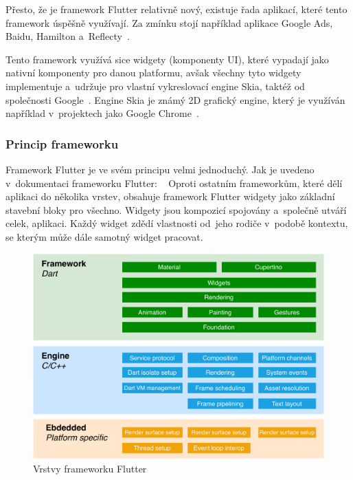 Přesto,
že je framework Flutter relativně nový,
existuje řada aplikací,
které tento framework úspěšně využívají.
Za zmínku stojí například aplikace Google Ads, Baidu, Hamilton
a~Reflecty~\cite{flutter}.

Tento framework využívá sice widgety (komponenty UI),
které vypadají jako nativní komponenty pro danou platformu,
avšak všechny tyto widgety implementuje a~udržuje pro vlastní vykreslovací
engine Skia,
taktéž od společnosti Google~\cite{flutter}.
Engine Skia je známý 2D grafický engine,
který je využíván například v~projektech jako Google Chrome~\cite{skia}.

\subsubsection*{Princip frameworku}

Framework Flutter je ve svém principu velmi jednoduchý.
Jak je uvedeno v~dokumentaci frameworku Flutter:
\emph{}~\cite{flutter_technical_overview}
Oproti ostatním frameworkům,
které dělí aplikaci do několika vrstev,
obsahuje framework Flutter widgety jako základní stavební bloky pro všechno.
Widgety jsou kompozicí spojovány a~společně utváří celek, aplikaci.
Každý widget zdědí vlastnosti od~jeho rodiče v~podobě kontextu,
se kterým může dále samotný widget pracovat.~\cite{flutter_technical_overview}

\begin{figure}
    \centering
    \includegraphics[width=\linewidth]{assets/technology-research/framework/flutter_overview.pdf}
    \caption{Vrstvy frameworku Flutter~\cite{flutter_technical_overview}}
    \label{fig:flutter_layers}
\end{figure}

